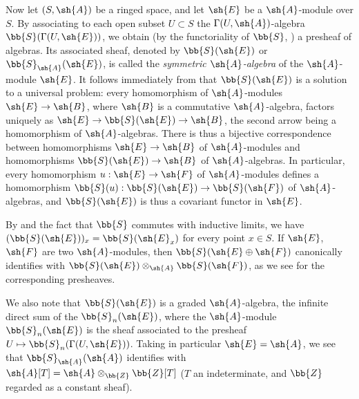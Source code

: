 \begin{env}[1.7.4]
\label{II.1.7.4}
Now let $(S,\sh{A})$ be a ringed space, and let $\sh{E}$ be a $\sh{A}$-module over $S$.
By associating to each open subset $U\subset S$ the $\Gamma(U,\sh{A})$-algebra $\bb{S}(\Gamma(U,\sh{E}))$, we obtain (by the functoriality of $\bb{S}$, ) a presheaf of algebras. Its associated sheaf, denoted by $\bb{S}(\sh{E})$ or $\bb{S}_\sh{A}(\sh{E})$, is called the \emph{symmetric $\sh{A}$-algebra} of the $\sh{A}$-module $\sh{E}$.
It follows immediately from  that $\bb{S}(\sh{E})$ is a solution to a universal problem: every homomorphism of $\sh{A}$-modules $\sh{E}\to\sh{B}$, where $\sh{B}$ is a commutative $\sh{A}$-algebra, factors uniquely as $\sh{E}\to\bb{S}(\sh{E})\to\sh{B}$, the second arrow being a homomorphism of $\sh{A}$-algebras.
There is thus a bijective correspondence between homomorphisms $\sh{E}\to\sh{B}$ of $\sh{A}$-modules and homomorphisms $\bb{S}(\sh{E})\to\sh{B}$ of $\sh{A}$-algebras.
In particular, every homomorphism $u:\sh{E}\to\sh{F}$ of $\sh{A}$-modules defines a homomorphism $\bb{S}(u):\bb{S}(\sh{E})\to\bb{S}(\sh{F})$ of $\sh{A}$-algebras, and $\bb{S}(\sh{E})$ is thus a covariant functor in $\sh{E}$.

By  and the fact that $\bb{S}$ commutes with inductive limits, we have $(\bb{S}(\sh{E}))_x=\bb{S}(\sh{E}_x)$ for every point $x\in S$.
If $\sh{E}$, $\sh{F}$ are two $\sh{A}$-modules, then $\bb{S}(\sh{E}\oplus\sh{F})$ canonically identifies with $\bb{S}(\sh{E})\otimes_\sh{A}\bb{S}(\sh{F})$, as we see for the corresponding presheaves.

We also note that $\bb{S}(\sh{E})$ is a graded $\sh{A}$-algebra, the infinite direct sum of the $\bb{S}_n(\sh{E})$, where the $\sh{A}$-module $\bb{S}_n(\sh{E})$ is the sheaf associated to the presheaf $U\mapsto\bb{S}_n(\Gamma(U,\sh{E}))$.
Taking in particular $\sh{E}=\sh{A}$, we see that $\bb{S}_\sh{A}(\sh{A})$ identifies with $\sh{A}[T]=\sh{A}\otimes_\bb{Z}\bb{Z}[T]$ ($T$ an indeterminate, and $\bb{Z}$ regarded as a constant sheaf).
\end{env}

